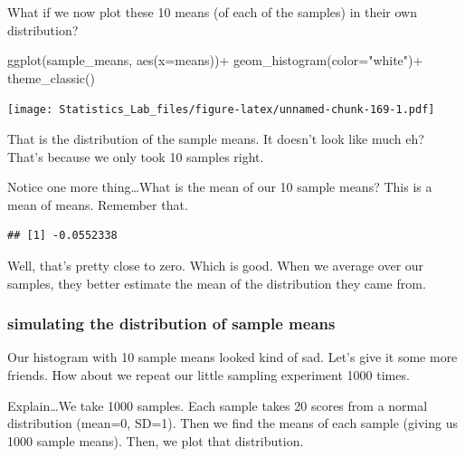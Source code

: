 \documentclass[
]{book}
\newenvironment{Shaded}{\begin{snugshade}}{\end{snugshade}}
\newcommand{\AttributeTok}[1]{\textcolor[rgb]{0.77,0.63,0.00}{#1}}
\newcommand{\FunctionTok}[1]{\textcolor[rgb]{0.00,0.00,0.00}{#1}}
\newcommand{\NormalTok}[1]{#1}
\newcommand{\SpecialCharTok}[1]{\textcolor[rgb]{0.00,0.00,0.00}{#1}}
\newcommand{\StringTok}[1]{\textcolor[rgb]{0.31,0.60,0.02}{#1}}
\begin{document}
What if we now plot these 10 means (of each of the samples) in their own distribution?

\begin{Shaded}
\begin{Highlighting}[]
 \FunctionTok{ggplot}\NormalTok{(sample\_means, }\FunctionTok{aes}\NormalTok{(}\AttributeTok{x=}\NormalTok{means))}\SpecialCharTok{+}
  \FunctionTok{geom\_histogram}\NormalTok{(}\AttributeTok{color=}\StringTok{"white"}\NormalTok{)}\SpecialCharTok{+}
  \FunctionTok{theme\_classic}\NormalTok{()}
\end{Highlighting}
\end{Shaded}

\texttt{[image: Statistics\_Lab\_files/figure-latex/unnamed-chunk-169-1.pdf]}

That is the distribution of the sample means. It doesn't look like much eh? That's because we only took 10 samples right.

Notice one more thing\ldots What is the mean of our 10 sample means? This is a mean of means. Remember that.

\begin{Shaded}
\end{Shaded}

\begin{verbatim}
## [1] -0.0552338
\end{verbatim}

Well, that's pretty close to zero. Which is good. When we average over our samples, they better estimate the mean of the distribution they came from.

\hypertarget{simulating-the-distribution-of-sample-means}{%
\subsubsection{simulating the distribution of sample means}\label{simulating-the-distribution-of-sample-means}}

Our histogram with 10 sample means looked kind of sad. Let's give it some more friends. How about we repeat our little sampling experiment 1000 times.

Explain\ldots We take 1000 samples. Each sample takes 20 scores from a normal distribution (mean=0, SD=1). Then we find the means of each sample (giving us 1000 sample means). Then, we plot that distribution.
\end{document}
